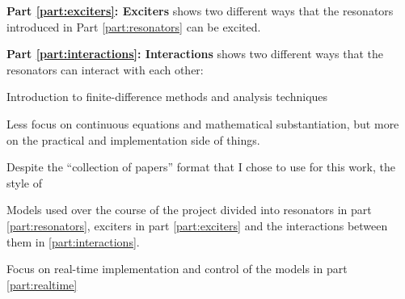 \textbf{Part \ref{part:exciters}: Exciters} shows two different ways that the resonators introduced in Part \ref{part:resonators} can be excited. 

\textbf{Part \ref{part:interactions}: Interactions} shows two different ways that the resonators can interact with each other: 


Introduction to finite-difference methods and analysis techniques

Less focus on continuous equations and mathematical substantiation, but more on the practical and implementation side of things.

Despite the ``collection of papers'' format that I chose to use for this work, the style of  




Models used over the course of the project divided into resonators in part \ref{part:resonators}, exciters in part \ref{part:exciters} and the interactions between them in \ref{part:interactions}.

Focus on real-time implementation and control of the models in part \ref{part:realtime}